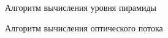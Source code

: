 \begin{figure}
\caption{Алгоритм вычисления уровня пирамиды}
\label{fig:calc_pyr}
\end{figure}

\begin{figure}
\caption{Алгоритм вычисления оптического потока}
\label{fig:calc_opt_flow}
\end{figure}

